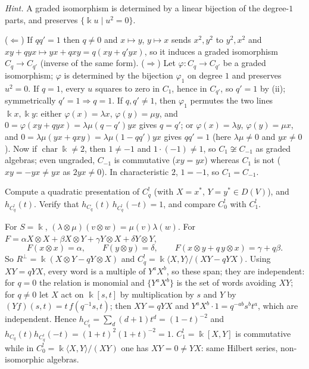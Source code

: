 \documentclass[11pt,a4paper]{exam}
\newcommand{\kk}{\Bbbk}
\begin{document}
\begin{questions}
\begin{parts}
\begin{subparts}
\emph{Hint.} A graded isomorphism is determined by a linear bijection of the degree-$1$ parts, and preserves $\{\kk u\mid u^2=0\}$.
\begin{solution}
($\Leftarrow$) If $qq'=1$ then $q\neq0$ and $x\mapsto y$, $y\mapsto x$ sends $x^2,y^2$ to $y^2,x^2$ and $xy+qyx\mapsto yx+qxy=q(xy+q'yx)$, so it induces a graded isomorphism $C_q\to C_{q'}$ (inverse of the same form).
($\Rightarrow$) Let $\varphi:C_q\to C_{q'}$ be a graded isomorphism; $\varphi$ is determined by the bijection $\varphi_1$ on degree $1$ and preserves $u^2=0$.
If $q=1$, every $u$ squares to zero in $C_1$, hence in $C_{q'}$, so $q'=1$ by (ii); symmetrically $q'=1\Rightarrow q=1$. If $q,q'\neq1$, then $\varphi_1$ permutes the two lines $\kk x,\kk y$:
either $\varphi(x)=\lambda x$, $\varphi(y)=\mu y$, and $0=\varphi(xy+qyx)=\lambda\mu(q-q')yx$ gives $q=q'$; or $\varphi(x)=\lambda y$, $\varphi(y)=\mu x$, and
$0=\lambda\mu(yx+qxy)=\lambda\mu(1-qq')yx$ gives $qq'=1$ (here $\lambda\mu\neq0$ and $yx\neq0$).
Now if $\operatorname{char}\kk\neq2$, then $1\neq-1$ and $1\cdot(-1)\neq1$, so $C_1\not\cong C_{-1}$ as graded algebras; even ungraded, $C_{-1}$ is commutative ($xy=yx$) whereas $C_1$ is not ($xy=-yx\neq yx$ as $2yx\neq0$).
In characteristic $2$, $1=-1$, so $C_1=C_{-1}$.
\end{solution}
\subpart Compute a quadratic presentation of $C_q^!$ (with $X=x^*$, $Y=y^*\in D(V)$), and $h_{C_q^!}(t)$. Verify
 that $h_{C_q}(t)\,h_{C_q^!}(-t)=1$,
and compare $C_0^!$ with $C_1^!$.
\begin{solution}
For $S=\kk$, $(\lambda\otimes\mu)(v\otimes w)=\mu(v)\lambda(w)$. For $F=\alpha X\otimes X+\beta X\otimes Y+\gamma Y\otimes X+\delta Y\otimes Y$,
\[
  F(x\otimes x)=\alpha,\qquad F(y\otimes y)=\delta,\qquad F(x\otimes y+q\,y\otimes x)=\gamma+q\beta.
\]
So $R^\perp=\kk(X\otimes Y-qY\otimes X)$ and $C_q^!=\kk\langle X,Y\rangle/(XY-qYX)$. Using $XY=qYX$, every word is a multiple of $Y^aX^b$, so these span; they are independent:
for $q=0$ the relation is monomial and $\{Y^aX^b\}$ is the set of words avoiding $XY$; for $q\neq0$ let $X$ act on $\kk[s,t]$ by multiplication by $s$ and $Y$ by $(Yf)(s,t)=t\,f(q^{-1}s,t)$; then $XY=qYX$ and $Y^aX^b\cdot1=q^{-ab}s^bt^a$, which are independent.
Hence $h_{C_q^!}=\sum_d(d+1)t^d=(1-t)^{-2}$ and $h_{C_q}(t)h_{C_q^!}(-t)=(1+t)^2(1+t)^{-2}=1$.
$C_1^!=\kk[X,Y]$ is commutative while in $C_0^!=\kk\langle X,Y\rangle/(XY)$ one has $XY=0\neq YX$: same Hilbert series, non-isomorphic algebras.
\end{solution}
\end{subparts}
\end{parts}

\end{questions}
\end{document}

